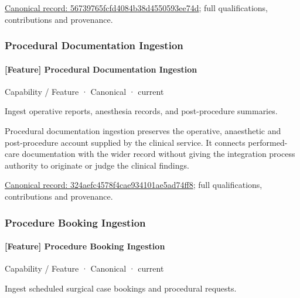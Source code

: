 {\footnotesize \href{../../../../continuum/strategy/capability/feature/56739765fcfd4084b38d4550593ee74d.md}{Canonical record: 56739765fcfd4084b38d4550593ee74d}; full qualifications, contributions and provenance.}\par
\subsubsection{Procedural Documentation Ingestion}

\paragraph{[Feature] Procedural Documentation Ingestion}

\label{element:324aefc4578f4cae934101ae5ad74ff8}
{\small Capability / Feature · Canonical · current}\par

Ingest operative reports, anesthesia records, and post-procedure summaries.



Procedural documentation ingestion preserves the operative, anaesthetic and post-procedure account supplied by the clinical service. It connects performed-care documentation with the wider record without giving the integration process authority to originate or judge the clinical findings.


{\footnotesize \href{../../../../continuum/strategy/capability/feature/324aefc4578f4cae934101ae5ad74ff8.md}{Canonical record: 324aefc4578f4cae934101ae5ad74ff8}; full qualifications, contributions and provenance.}\par
\subsubsection{Procedure Booking Ingestion}

\paragraph{[Feature] Procedure Booking Ingestion}

\label{element:12e0f64cff2043339be17fb38708247a}
{\small Capability / Feature · Canonical · current}\par

Ingest scheduled surgical case bookings and procedural requests.



